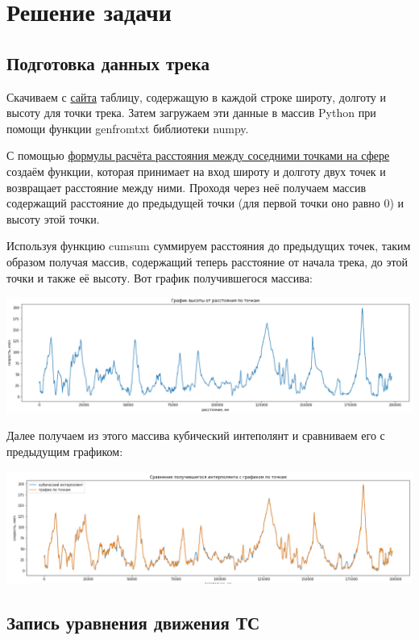 \documentclass[A4paper,12pt]{article}
\theoremstyle{plain} %
\theoremstyle{definition} %
\theoremstyle{remark} %
\begin{document}
\newpage
\section*{Решение задачи}
\subsection*{Подготовка данных трека}
Скачиваем с \href{http://www.gpsies.com/map.do?fileId=cdweryabbnalhhik&referrer=trackList}{сайта} таблицу, содержащую в каждой строке широту, долготу и высоту для точки трека. Затем загружаем эти данные в массив Python при помощи функции genfromtxt библиотеки numpy.

С помощью \href{http://gis-lab.info/qa/great-circles.html}{формулы расчёта расстояния между соседними точками на сфере} создаём функции, которая принимает на вход широту и долготу двух точек и возвращает расстояние между ними. Проходя через неё получаем массив содержащий расстояние до предыдущей точки (для первой точки оно равно 0) и высоту этой точки.

Используя функцию cumsum суммируем расстояния до предыдущих точек, таким образом получая массив, содержащий теперь расстояние от начала трека, до этой точки и также её высоту. Вот график получившегося массива:

\includegraphics[scale = 0.6]{График по точкам.png}

Далее получаем из этого массива кубический интеполянт и сравниваем его с предыдущим графиком:

\includegraphics[scale = 0.6]{Сравнение графиков.png}

\subsection*{Запись уравнения движения ТС}
\end{document}
